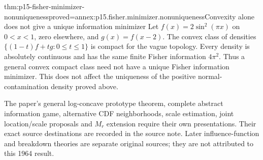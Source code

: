\begin{hbtheorem}{thm:p15-fisher-minimizer-nonuniqueness}{proved=annex:p15.fisher.minimizer.nonuniqueness}{Convexity alone does not give a unique information minimizer}
Let \(f(x)=2\sin^2(\pi x)\) on \(0<x<1\), zero elsewhere,
and \(g(x)=f(x-2)\). The convex class of densities
\(\{(1-t)f+tg:0\leq t\leq1\}\) is compact for the vague topology.
Every density is absolutely continuous and has the same finite
Fisher information \(4\pi^2\).
Thus a general convex compact class need not have a unique Fisher
information minimizer. This does not affect the uniqueness of the
positive normal-contamination density proved above.
\end{hbtheorem}

The paper's general log-concave prototype theorem, complete abstract
information game, alternative CDF neighborhoods, scale estimation,
joint location/scale proposals and \(M_r\) extension require their own
presentations. Their exact source destinations are recorded in the
source note. Later influence-function and breakdown theories are
separate original sources; they are not attributed to this 1964 result.
